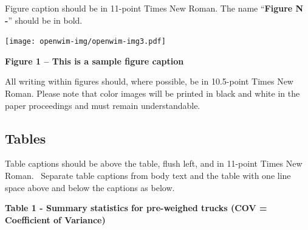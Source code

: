\documentclass[a4paper]{article}
\begin{document}
\bigskip

{
Figure caption should be in 11-point Times New Roman. The name
“\textbf{Figure N -}” should be in bold.}


\bigskip

{\centering 
\texttt{[image: openwim-img/openwim-img3.pdf]}
\par}

{\centering{}\bfseries
Figure 1 – This is a sample figure caption
\par}


\bigskip

{
All writing within figures should, where possible, be in 10.5-point
Times New Roman. Please note that color images will be printed in black
and white in the paper proceedings and must remain understandable. }

\subsection{Tables}
{
Table captions should be above the table, flush left, and in 11-point
Times New Roman. \ Separate table captions from body text and the table
with one line space above and below the captions as below. \ }


\bigskip

{\bfseries
Table 1 - Summary statistics for pre-weighed trucks (COV = Coefficient
of Variance)}


\bigskip
\end{document}
